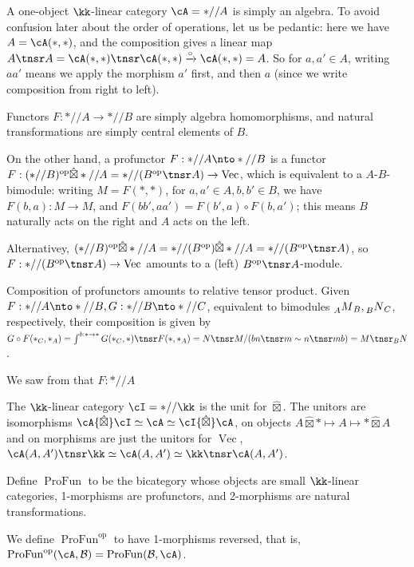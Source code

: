 \documentclass[12pt]{article}
\newcommand{\op}{{\text{op}}}
\newcommand{\cB}{{\mathcal{B}}}
\newcommand{\hatbox}{{\hat{\boxtimes}}}
\DeclareMathOperator{\Vect}{Vec}
\DeclareMathOperator{\Profun}{ProFun}
\newcommand{\Profunop}{{\Profun}^\op}
\begin{document}
\begin{example}
\label{x:profunctor-bimodule}
A one-object $\kk$-linear category $\cA = *//A$
is simply an algebra.
To avoid confusion later about the order of operations,
let us be pedantic: here we have $A = \cA(*,*)$,
and the composition gives a linear map
$A \tnsr A = \cA(*,*) \tnsr \cA(*,*) \xrightarrow{\circ} \cA(*,*) = A$.
So for $a,a'\in A$,
writing $aa'$ means we apply the morphism $a'$ first,
and then $a$
(since we write composition from right to left).

Functors $F: *//A \to *//B$ are simply algebra homomorphisms,
and natural transformations are simply central elements of $B$.

On the other hand, a profunctor $F: *//A \nto *//B$
is a functor
$F: (*//B)^\op \hatbox *//A = *//(B^\op \tnsr A) \to \Vect$,
which is equivalent to a $A$-$B$-bimodule:
writing $M = F(*,*)$,
for $a,a' \in A, b,b' \in B$,
we have $F(b,a): M \to M$,
and $F(bb',aa') = F(b',a) \circ F(b,a')$;
this means $B$ naturally acts on the right
and $A$ acts on the left.

Alternativey,
$(*//B)^\op \hatbox *//A = *//(B^\op) \hatbox *//A = *//(B^\op \tnsr A)$,
so $F: *//(B^\op \tnsr A) \to \Vect$
amounts to a (left) $B^\op \tnsr A$-module.


Composition of profunctors amounts to relative tensor product.
Given $F: *//A \nto *//B, G: *//B \nto *//C$,
equivalent to bimodules $\prescript{}{A}M_B,
\prescript{}{B}N_C$, respectively,
their composition is given by
$G \circ F(*_C,*_A) = \int^{b:* \to *} G(*_C,*) \tnsr F(*,*_A)
= N \tnsr M / (bn \tnsr m \sim n \tnsr mb)
= M \tnsr_B N$.
\end{example}


\begin{remark}
We saw from 
that $F: *//A$
\end{remark}


\begin{example}
The $\kk$-linear category $\cI = *//\kk$
is the unit for $\hatbox$.
The unitors are isomorphisms
$\cA \hatbox \cI \simeq \cA \simeq \cI \hatbox \cA$,
on objects
$A \hatbox * \mapsto A \mapsto * \hatbox A$
and on morphisms are just the unitors for $\Vect$,
$\cA(A,A') \tnsr \kk \simeq \cA(A,A') \simeq
\kk \tnsr \cA(A,A')$.
\end{example}


\begin{definition}
Define $\Profun$ to be the bicategory
whose objects are small $\kk$-linear categories,
1-morphisms are profunctors,
and 2-morphisms are natural transformations.

We define $\Profunop$ to have 1-morphisms reversed,
that is,
$\Profunop(\cA,\cB) = \Profun(\cB,\cA)$.
\end{definition}
\end{document}
